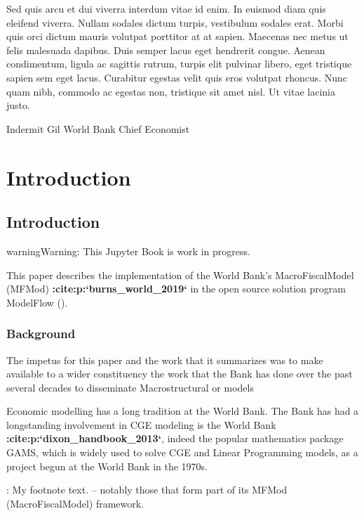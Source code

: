 \documentclass[letterpaper,10pt,english]{jupyterBook}
\begin{document}
\sphinxAtStartPar
Sed quis arcu et dui viverra interdum vitae id enim. In euismod diam quis eleifend viverra. Nullam sodales dictum turpis, vestibulum sodales erat. Morbi quis orci dictum mauris volutpat porttitor at at sapien. Maecenas nec metus ut felis malesuada dapibus. Duis semper lacus eget hendrerit congue. Aenean condimentum, ligula ac sagittis rutrum, turpis elit pulvinar libero, eget tristique sapien sem eget lacus. Curabitur egestas velit quis eros volutpat rhoncus. Nunc quam nibh, commodo ac egestas non, tristique sit amet nisl. Ut vitae lacinia justo.

\sphinxAtStartPar
Indermit Gil
World Bank Chief Economist

\sphinxstepscope


\part{Introduction}

\sphinxstepscope


\chapter{Introduction}
\label{\detokenize{content/01_Introduction/Introduction:introduction}}\label{\detokenize{content/01_Introduction/Introduction::doc}}
\begin{sphinxadmonition}{warning}{Warning:}
\sphinxAtStartPar
This Jupyter Book is work in progress.
\end{sphinxadmonition}

\sphinxAtStartPar
This paper describes the implementation of the World Bank’s MacroFiscalModel (MFMod) {\color{red}\bfseries{}:cite:p:`burns\_world\_2019`} in the open source solution program ModelFlow ().


\section{Background}
\label{\detokenize{content/01_Introduction/Introduction:background}}
\sphinxAtStartPar
The impetus for this paper and the work that it summarizes was to make available to a wider constituency the work that the Bank has done over the past several decades to disseminate Macro\sphinxhyphen{}structural or models%
\begin{footnote}[1]\sphinxAtStartFootnote
Economic modelling has a long tradition at the World Bank.  The Bank has had a long\sphinxhyphen{}standing involvement in CGE modeling is the World Bank {\color{red}\bfseries{}:cite:p:`dixon\_handbook\_2013`}, indeed the popular mathematics package GAMS, which is widely used to solve CGE and Linear Programming models,  as a project begun at the World Bank in the 1970s.
%
\end{footnote}: My footnote text. – notably those that form part of its MFMod (MacroFiscalModel) framework.
\end{document}

